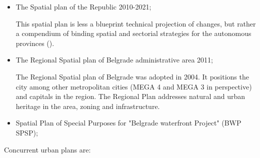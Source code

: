 \documentclass[11pt]{report}
\begin{document}
\begin{itemize}
\item The Spatial plan of the Republic 2010-2021;

This spatial plan is less a blueprint technical projection of changes, but rather a compendium of binding spatial and sectorial strategies for the autonomous provinces (\cite{Stojkov and Dobricic 2012 02}).

\item  The Regional Spatial plan of Belgrade administrative area 2011;

The Regional Spatial plan of Belgrade was adopted in 2004.
It positions the city among other metropolitan cities (MEGA 4 and MEGA 3 in perspective) and capitals in the region.
The Regional Plan addresses natural and urban heritage in the area, zoning and infrastructure. 

\item Spatial Plan of Special Purposes for "Belgrade waterfront Project" (BWP SPSP);
\end{itemize}

Concurrent urban plans are:
\end{document}
